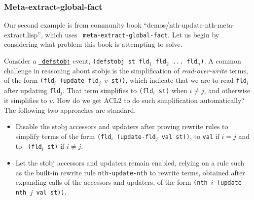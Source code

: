 \subsubsection{Meta-extract-global-fact}

Our second example is from community book
  ``demos/nth-update-nth-meta-extract.lisp'', which uses {\tt
  meta-extract-global-fact}.  Let us begin by considering what problem this
book is attempting to solve.



Consider a
\href{http://www.cs.utexas.edu/users/moore/acl2/manuals/current/manual/index.html?topic=ACL2\_\_\_\_DEFSTOBJ}{\underline{\tt
    defstobj}} event, {\tt (defstobj st fld$_1$ fld$_2$ ... fld$_n$)}.
A common challenge in reasoning about stobjs is the simplification of
{\em read-over-write} terms, of the form {\tt (fld$_i$ (update-fld$_j$
  $v$ st))}, which indicate that we are to read {\tt fld$_i$} after
updating {\tt fld$_j$}.  That term simplifies to {\tt (fld$_i$ st)}
when $i \neq j$, and otherwise it simplifies to $v$.  How do we get
ACL2 to do such simplification automatically?  The following two
approaches are standard.

\begin{itemize}

\item Disable the stobj accessors and updaters after proving
  rewrite rules to simplify terms of the form {\tt (fld$_i$
    (update-fld$_j$ val st))}, to {\tt val} if $i = j$ and to {\tt
    (fld$_i$ st)} if $i \neq j$.

\item Let the stobj accessors and updaters remain enabled, relying on
  a rule such as the built-in rewrite rule {\tt nth-update-nth} to
  rewrite terms, obtained after expanding calls of the accessors and
  updaters, of the form {\tt (nth $i$ (update-nth $j$ val st))}.

\end{itemize}

